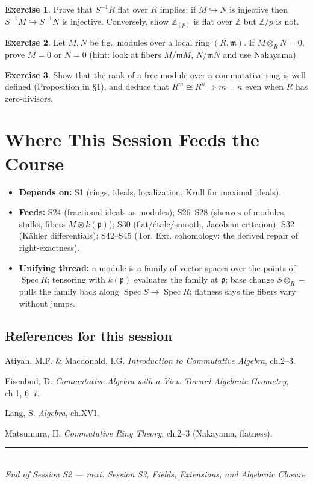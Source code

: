 \documentclass[11pt,a4paper]{article}
\theoremstyle{definition}
\newtheorem{exercise}{Exercise}
\newcommand{\Z}{\mathbb{Z}}
\newcommand{\m}{\mathfrak{m}}
\newcommand{\Spec}{\operatorname{Spec}}
\newcommand{\p}{\mathfrak{p}}
\begin{document}
\begin{exercise}
Prove that $S^{-1}R$ flat over $R$ implies: if $M\hookrightarrow N$ is injective then
$S^{-1}M\hookrightarrow S^{-1}N$ is injective. Conversely, show $\Z_{(p)}$ is flat over $\Z$ but
$\Z/p$ is not.
\end{exercise}
\begin{exercise}
Let $M,N$ be f.g.\ modules over a local ring $(R,\m)$. If $M\otimes_R N=0$, prove $M=0$ or $N=0$
(hint: look at fibers $M/\m M$, $N/\m N$ and use Nakayama).
\end{exercise}
\begin{exercise}
Show that the rank of a free module over a commutative ring is well defined (Proposition in \S1),
and deduce that $R^m\cong R^n\Rightarrow m=n$ even when $R$ has zero-divisors.
\end{exercise}

\section*{Where This Session Feeds the Course}
\begin{itemize}
  \item \textbf{Depends on:} S1 (rings, ideals, localization, Krull for maximal ideals).
  \item \textbf{Feeds:} S24 (fractional ideals as modules); S26--S28 (sheaves of modules, stalks,
    fibers $M\otimes k(\p)$); S30 (flat/\'etale/smooth, Jacobian criterion); S32 (K\"ahler differentials);
    S42--S45 (Tor, Ext, cohomology: the derived repair of right-exactness).
  \item \textbf{Unifying thread:} a module is a family of vector spaces over the points of $\Spec R$;
    tensoring with $k(\p)$ evaluates the family at $\p$; base change $S\otimes_R-$ pulls the family
    back along $\Spec S\to\Spec R$; flatness says the fibers vary without jumps.
\end{itemize}

\subsection*{References for this session}
\begin{enumerate}[label={[\arabic*]}]
  \item Atiyah, M.F. \& Macdonald, I.G. \emph{Introduction to Commutative Algebra}, ch.2--3.
  \item Eisenbud, D. \emph{Commutative Algebra with a View Toward Algebraic Geometry}, ch.1, 6--7.
  \item Lang, S. \emph{Algebra}, ch.XVI.
  \item Matsumura, H. \emph{Commutative Ring Theory}, ch.2--3 (Nakayama, flatness).
\end{enumerate}

\vspace{1.5em}
\begin{center}
\rule{0.6\textwidth}{0.4pt}\\[0.5em]
\textit{End of Session S2 --- next: Session S3, Fields, Extensions, and Algebraic Closure}
\end{center}
\end{document}
